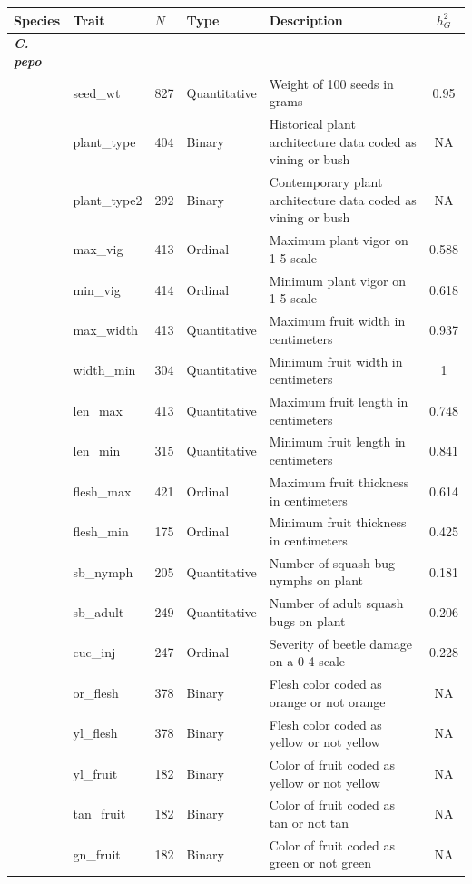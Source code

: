 \documentclass[utf8]{FrontiersinHarvard} %
\begin{document}
\begin{center}
\begin{longtable}{l l l l p{5cm} c}
\hline
\textbf{Species} & \textbf{Trait} & \textbf{$N$} &\textbf{Type} & \textbf{Description} & \textbf{$h_{G}^{2}$} \\
\hline
\textbf{\emph{C. pepo}} & & & & & \\
& seed\_wt & 827 &Quantitative & Weight of 100 seeds in grams& 0.95 \\
& plant\_type & 404 &Binary & Historical plant architecture data coded as vining or bush& NA \\
& plant\_type2 & 292 &Binary & Contemporary plant architecture data coded as vining or bush& NA\\
& max\_vig & 413 & Ordinal & Maximum plant vigor on 1-5 scale& 0.588 \\
& min\_vig & 414 &Ordinal & Minimum plant vigor on 1-5 scale & 0.618 \\
& max\_width & 413 &Quantitative & Maximum fruit width in centimeters & 0.937 \\
& width\_min & 304 &Quantitative & Minimum fruit width in centimeters & 1\\
& len\_max & 413 &Quantitative & Maximum fruit length in centimeters & 0.748\\
& len\_min & 315 &Quantitative & Minimum fruit length in centimeters & 0.841\\
& flesh\_max & 421 &Ordinal & Maximum fruit thickness in centimeters & 0.614\\
& flesh\_min & 175 & Ordinal & Minimum fruit thickness in centimeters & 0.425\\
& sb\_nymph & 205 & Quantitative & Number of squash bug nymphs on plant & 0.181 \\
& sb\_adult & 249 &Quantitative & Number of adult squash bugs on plant & 0.206 \\
& cuc\_inj & 247 &Ordinal & Severity of beetle damage on a 0-4 scale & 0.228\\
& or\_flesh & 378 &Binary & Flesh color coded as orange or not orange & NA \\
& yl\_flesh & 378 &Binary & Flesh color coded as yellow or not yellow & NA \\
& yl\_fruit & 182 &Binary & Color of fruit coded as yellow or not yellow & NA\\
& tan\_fruit & 182 &Binary & Color of fruit coded as tan or not tan & NA \\
& gn\_fruit & 182 &Binary & Color of fruit coded as green or not green & NA \\

\end{longtable}
\end{center}
\end{document}
